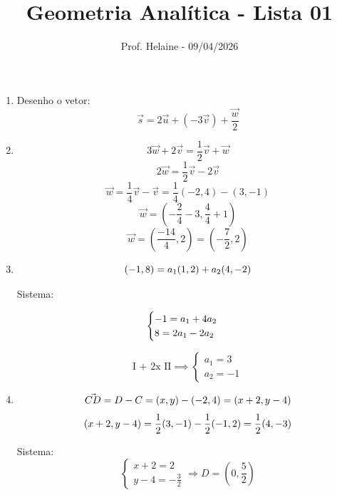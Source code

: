 \documentclass[
  12pt,
  openright,
  a4paper,
  twoside,
  english,
  brazil,
]{article}
\title{Geometria Analítica - Lista 01}
\author{Prof. Helaine - 09/04/2026}
\date{}
\begin{document}
\maketitle

\begin{enumerate}[\bfseries  1.]

  \item Desenho o vetor:
    $$
    \vec{s} = 2\vec{u} + (-3\vec{v}) + \frac{\vec{w}}{2}
    $$

  \item
    $$
    3\vec{w} + 2\vec{v} = \frac{1}{2}\vec{v} + \vec{w}
    $$
    $$
    2\vec{w} = \frac{1}{2}\vec{v} - 2\vec{v}
    $$
    $$
    \vec{w} = \frac{1}{4}\vec{v} - \vec{v} = \frac{1}{4}(-2, 4) - (3, -1)
    $$
    $$
    \vec{w} = \left(-\frac{2}{4} - 3, \frac{4}{4} + 1\right)
    $$
    $$
    \vec{w} = \left(\frac{-14}{4}, 2\right) = \left(-\frac{7}{2}, 2\right)
    $$

  \item
    $$
    (-1, 8) = a_1(1, 2) + a_2(4, -2)\\
    $$

    Sistema:

    $$
    \begin{cases}
      -1 = a_1 + 4a_2 \\
      8 = 2a_1 - 2a_2
    \end{cases}\\
    $$

    $$
    \text{I + 2x II}\implies
    \begin{cases}
      a_1 = 3\\
      a_2 = -1
    \end{cases}
    $$

  \item
    $$
    \vec{CD} = D - C = (x, y) - (-2, 4) = (x + 2, y - 4)\\
    $$
    $$
    (x + 2, y - 4) = \frac{1}{2}(3, -1) - \frac{1}{2}(-1, 2) =
    \frac{1}{2}(4, -3)\\
    $$

    Sistema:
    $$
    \begin{cases} x + 2 = 2 \\ y - 4 = -\frac{3}{2}
    \end{cases} \Rightarrow D = \left(0, \frac{5}{2}\right)
    $$


\end{enumerate}
\end{document}
